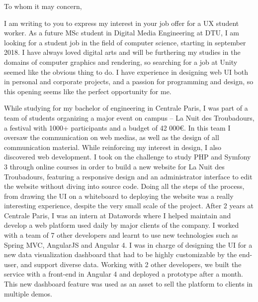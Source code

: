 \documentclass[12pt, a4paper]{awesome-cv}
\begin{document}
\makecvheader[R]



\begin{cvletter}

\vspace{20mm}
To whom it may concern,

I am writing to you to express my interest in your job offer for a UX student worker. As a future MSc student in Digital Media Engineering at DTU, I am looking for a student job in the field of computer science, starting in september 2018. I have always loved digital arts and will be furthering my studies in the domains of computer graphics and rendering, so searching for a job at Unity seemed like the obvious thing to do. I have experience in designing web UI both in personal and corporate projects, and a passion for programming and design, so this opening seems like the perfect opportunity for me.

While studying for my bachelor of engineering in Centrale Paris, I was part of a team of students organizing a major event on campus – La Nuit des Troubadours, a festival with 1000+ participants and a budget of 42 000€. In this team I oversaw the communication on web medias, as well as the design of all communication material. While reinforcing my interest in design, I also discovered web development. I took on the challenge to study PHP and Symfony 3 through online courses in order to build a new website for La Nuit des Troubadours, featuring a responsive design and an administrator interface to edit the website without diving into source code. Doing all the steps of the process, from drawing the UI on a whiteboard to deploying the website was a really interesting experience, despite the very small scale of the project.
After 2 years at Centrale Paris, I was an intern at Datawords where I helped maintain and develop a web platform used daily by major clients of the company. I worked with a team of 7 other developers and learnt to use new technologies such as Spring MVC, AngularJS and Angular 4. I was in charge of designing the UI for a new data visualization dashboard that had to be highly customizable by the end-user, and support diverse data. Working with 2 other developers, we built the service with a front-end in Angular 4 and deployed a prototype after a month. This new dashboard feature was used as an asset to sell the platform to clients in multiple demos.


\end{cvletter}
\end{document}
